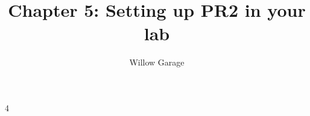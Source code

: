 \documentclass[11pt]{book}
\begin{document}
\title{Chapter 5: Setting up PR2 in your lab}
\author{Willow Garage}
\newcommand{\TODO}[1]{\textcolor{red}{TODO: #1}}
\maketitle
\newpage
\tableofcontents
\newpage
\addtocounter {chapter} {4} 

\end{document}

